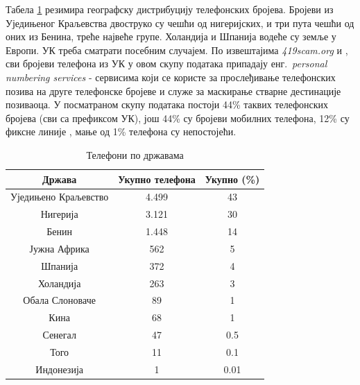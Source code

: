 \documentclass[a4paper]{article}
\begin{document}
Табела \ref{tab:tabela2} резимира географску дистрибуцију телефонских бројева. Бројеви из Уједињеног Краљевства двоструко су чешћи од нигеријских, и три пута чешћи од оних из Бенина, треће највеће групе. Холандија и Шпанија водеће су земље у Европи. УК треба сматрати посебним случајем. По извештајима \emph{419scam.org} и \cite{phone}, сви бројеви телефона из УК у овом скупу података припадају енг.~{\em personal numbering services} - сервисима који се користе за прослеђивање телефонских позива на друге телефонске бројеве и служе за маскирање стварне дестинације позиваоца. У посматраном скупу података постоји 44\% таквих телефонских бројева (сви са префиксом УК), још 44\% су бројеви мобилних телефона, 12\% су фиксне линије \cite{phone}, мање од 1\% телефона су непостојећи.

\begin{table}[h!]
\begin{center}
\caption{Телефони по државама}
\begin{tabular}{|c|c|c|} \hline
\textbf{Држава} & \textbf{Укупно телефона} & \textbf{Укупно (\%)}\\ \hline
Уједињено Краљевство & 4.499 & 43\\ \hline
Нигерија & 3.121 & 30\\ \hline
Бенин & 1.448 & 14\\ \hline
Јужна Африка & 562 & 5\\ \hline
Шпанија & 372 & 4\\ \hline
Холандија & 263 & 3\\ \hline
Обала Слоноваче & 89 & 1\\ \hline
Кина & 68 & 1\\ \hline
Сенегал & 47 & 0.5\\ \hline
Того & 11 & 0.1\\ \hline
Индонезија & 1 & 0.01\\ \hline
\end{tabular}
\label{tab:tabela2}
\end{center}
\end{table}
\end{document}
